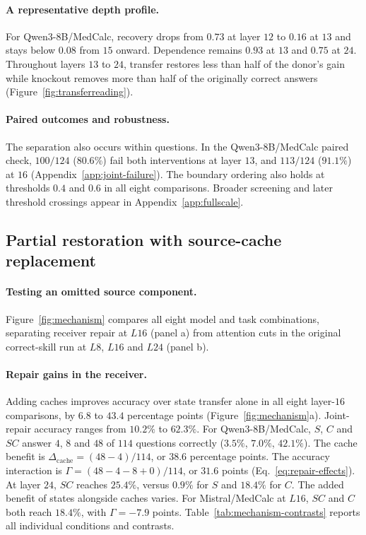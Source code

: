 \paragraph{A representative depth profile.}
For Qwen3-8B/MedCalc, recovery drops from $0.73$
at layer $12$ to $0.16$ at $13$ and stays below $0.08$ from $15$ onward.
Dependence remains $0.93$ at $13$ and $0.75$ at $24$.
Throughout layers $13$ to $24$, transfer restores less than half of the
donor's gain while knockout removes more than half of the originally
correct answers (Figure~\ref{fig:transferreading}).

\paragraph{Paired outcomes and robustness.}
The separation also occurs within questions. In the Qwen3-8B/MedCalc
paired check, $100/124$
($80.6\%$) fail both interventions at layer $13$, and $113/124$ ($91.1\%$)
at $16$ (Appendix~\ref{app:joint-failure}). The boundary ordering also
holds at thresholds $0.4$ and $0.6$ in all eight comparisons. Broader
screening and later threshold crossings appear in Appendix~\ref{app:fullscale}.

\subsection{Partial restoration with source-cache replacement}
\label{sec:mechanism}

\paragraph{Testing an omitted source component.}
Figure~\ref{fig:mechanism} compares all eight model and task combinations,
separating receiver repair at $L16$ (panel a) from attention cuts in the
original correct-skill run at $L8$, $L16$ and $L24$ (panel b).

\paragraph{Repair gains in the receiver.}
Adding caches improves accuracy over state transfer alone in all eight
layer-$16$ comparisons, by $6.8$ to $43.4$ percentage points
(Figure~\ref{fig:mechanism}a). Joint-repair accuracy ranges from $10.2\%$
to $62.3\%$. For Qwen3-8B/MedCalc, $S$, $C$ and $SC$ answer $4$, $8$
and $48$ of $114$ questions correctly ($3.5\%$, $7.0\%$, $42.1\%$).
The cache benefit is $\Delta_{\mathrm{cache}}=(48-4)/114$, or $38.6$
percentage points. The accuracy interaction is
$\Gamma=(48-4-8+0)/114$, or $31.6$ points (Eq.~\eqref{eq:repair-effects}).
At layer $24$, $SC$ reaches $25.4\%$, versus $0.9\%$ for $S$ and
$18.4\%$ for $C$. The added benefit of states alongside caches varies.
For Mistral/MedCalc at $L16$, $SC$ and $C$ both reach $18.4\%$, with
$\Gamma=-7.9$ points. Table~\ref{tab:mechanism-contrasts} reports all
individual conditions and contrasts.

